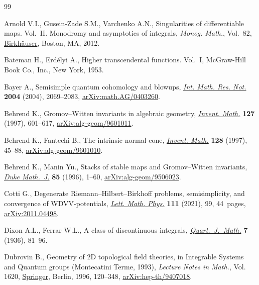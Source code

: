 \documentclass[10pt,a4paper]{article}
\numberwithin{equation}{section}
\begin{document}
\begin{thebibliography}{99}
\footnotesize\itemsep=0pt

Arnold V.I., Gusein-Zade S.M., Varchenko A.N., Singularities of differentiable
 maps. {V}ol.~{II}. {M}onodromy and asymptotics of integrals, \textit{Monog.
 Math.}, Vol.~82, \href{https://doi.org/10.1007/978-0-8176-8343-6}{Birkh\"auser}, Boston, MA, 2012.

Bateman H., Erd\'elyi A., Higher transcendental functions. {V}ol.~{I},
 McGraw-Hill Book Co., Inc., New York, 1953.

Bayer A., Semisimple quantum cohomology and blowups, \href{https://doi.org/10.1155/S1073792804140907}{\textit{Int. Math. Res.
 Not.}} \textbf{2004} (2004), 2069--2083, \href{https://arxiv.org/abs/math.AG/0403260}{arXiv:math.AG/0403260}.

Behrend K., Gromov--{W}itten invariants in algebraic geometry, \href{https://doi.org/10.1007/s002220050132}{\textit{Invent.
 Math.}} \textbf{127} (1997), 601--617, \href{https://arxiv.org/abs/alg-geom/9601011}{arXiv:alg-geom/9601011}.

Behrend K., Fantechi B., The intrinsic normal cone, \href{https://doi.org/10.1007/s002220050136}{\textit{Invent. Math.}}
 \textbf{128} (1997), 45--88, \href{https://arxiv.org/abs/alg-geom/9601010}{arXiv:alg-geom/9601010}.

Behrend K., Manin Yu., Stacks of stable maps and {G}romov--{W}itten invariants,
 \href{https://doi.org/10.1215/S0012-7094-96-08501-4}{\textit{Duke Math.~J.}} \textbf{85} (1996), 1--60, \href{https://arxiv.org/abs/alg-geom/9506023}{arXiv:alg-geom/9506023}.

Cotti G., Degenerate {R}iemann--{H}ilbert--{B}irkhoff problems, semisimplicity,
 and convergence of {WDVV}-potentials, \href{https://doi.org/10.1007/s11005-021-01427-9}{\textit{Lett. Math. Phys.}} \textbf{111}
 (2021), 99, 44~pages, \href{https://arxiv.org/abs/2011.04498}{arXiv:2011.04498}.

Dixon A.L., Ferrar W.L., A class of discontinuous integrals,
 \href{https://doi.org/10.1093/qmath/os-7.1.81}{\textit{Quart.~J.~Math.}} \textbf{7} (1936), 81--96.

Dubrovin B., Geometry of {$2$}{D} topological field theories, in Integrable
 {S}ystems and {Q}uantum groups ({M}ontecatini {T}erme, 1993), \textit{Lecture
 Notes in Math.}, Vol. 1620, \href{https://doi.org/10.1007/BFb0094793}{Springer}, Berlin, 1996, 120--348,
 \href{https://arxiv.org/abs/hep-th/9407018}{arXiv:hep-th/9407018}.


\end{thebibliography}
\end{document}

